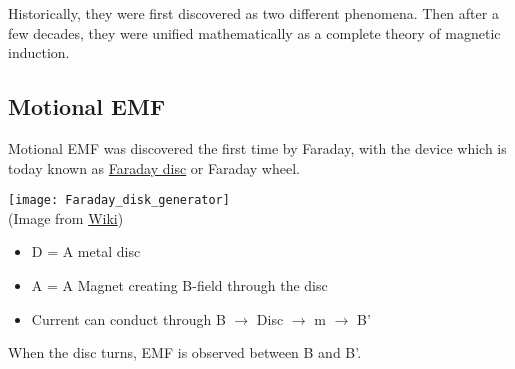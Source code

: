 \documentclass[class=article, crop=false, 12pt]{standalone}
\begin{document}
Historically, they were first discovered as two different phenomena.
Then after a few decades, 
they were unified mathematically as a complete theory of magnetic induction.


\newpage
\subsection{Motional EMF}

Motional EMF was discovered the first time by Faraday, 
with the device which is today known as 
\href{https://en.wikipedia.org/wiki/Homopolar_generator}{Faraday disc} or Faraday wheel.

\begin{center}
    \begin{minipage}{0.28\linewidth}
        \centering
        \texttt{[image: Faraday\_disk\_generator]}\\
        (Image from \href{https://en.wikipedia.org/wiki/Faraday%27s_law_of_induction#/media/File:Faraday_disk_generator.jpg}{Wiki})
    \end{minipage}
    \hspace{0.02\textwidth}
    \begin{minipage}{0.6\linewidth}
        \begin{itemize}
            \item D = A metal disc
            \item A = A Magnet creating B-field through the disc
            \item Current can conduct through B $\rightarrow$ Disc $\rightarrow$ m $\rightarrow$ B'
        \end{itemize}

        When the disc turns, EMF is observed between B and B'.
    \end{minipage}
\end{center}
\end{document}
